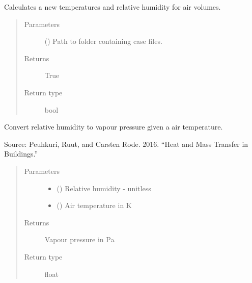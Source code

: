 \documentclass[letterpaper,10pt,english]{sphinxmanual}
\begin{document}
\begin{fulllineitems}
\label{\detokenize{air:livestock.air.new_temperature_and_relative_humidity}}
Calculates a new temperatures and relative humidity for air volumes.
\begin{quote}\begin{description}
\item[{Parameters}] \leavevmode
{} () \textendash{} Path to folder containing case files.

\item[{Returns}] \leavevmode
True

\item[{Return type}] \leavevmode
bool

\end{description}\end{quote}

\end{fulllineitems}


\begin{fulllineitems}
\label{\detokenize{air:livestock.air.relative_humidity_to_vapour_pressure}}
Convert relative humidity to vapour pressure given a air temperature.

Source: Peuhkuri, Ruut, and Carsten Rode. 2016.
“Heat and Mass Transfer in Buildings.”
\begin{quote}\begin{description}
\item[{Parameters}] \leavevmode\begin{itemize}
\item {} 
 () \textendash{} Relative humidity - unitless

\item {} 
 () \textendash{} Air temperature in K

\end{itemize}

\item[{Returns}] \leavevmode
Vapour pressure in Pa

\item[{Return type}] \leavevmode
float

\end{description}\end{quote}

\end{fulllineitems}
\end{document}
